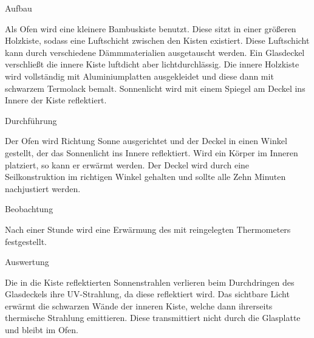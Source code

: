 
Aufbau

Als Ofen wird eine kleinere Bambuskiste benutzt. Diese sitzt in einer größeren Holzkiste, sodass eine Luftschicht zwischen den Kisten existiert. Diese Luftschicht kann durch verschiedene Dämmmaterialien ausgetauscht werden. Ein Glasdeckel verschließt die innere Kiste luftdicht aber lichtdurchlässig. Die innere Holzkiste wird vollständig mit Aluminiumplatten ausgekleidet und diese dann mit schwarzem Termolack bemalt. Sonnenlicht wird mit einem Spiegel am Deckel ins Innere der Kiste reflektiert. 

Durchführung

Der Ofen wird Richtung Sonne ausgerichtet und der Deckel in einen Winkel gestellt, der das Sonnenlicht ins Innere reflektiert. Wird ein Körper im Inneren platziert, so kann er erwärmt werden. 
Der Deckel wird durch eine Seilkonstruktion im richtigen Winkel gehalten und sollte alle Zehn Minuten nachjustiert werden.

Beobachtung

Nach einer Stunde wird eine Erwärmung des mit reingelegten Thermometers festgestellt. 

Auswertung

Die in die Kiste reflektierten Sonnenstrahlen verlieren beim Durchdringen des Glasdeckels ihre UV-Strahlung, da diese reflektiert wird. Das sichtbare Licht erwärmt die schwarzen Wände der inneren Kiste, welche dann ihrerseits thermische Strahlung emittieren. Diese transmittiert nicht durch die Glasplatte und bleibt im Ofen.
